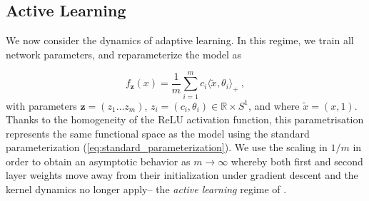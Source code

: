 \subsection{Active Learning}

We now consider the dynamics of adaptive learning. In this regime, we train all network parameters, and reparameterize the model as 


\begin{equation}
    f_\mathbf{z}(x) = \frac{1}{m}\sum_{i=1}^m c_i \langle \tilde{x}, \theta_i \rangle_+~,
\end{equation}
with parameters $\mathbf{z}=(z_1\dots z_m)$, $z_i=(c_i ,\theta_i) \in \mathbb{R} \times S^1$, and  
where $\tilde{x} = (x, 1)$. %
Thanks to the homogeneity of the ReLU activation function, this parametrisation represents the same functional space as the model using the standard parameterization (\ref{eq:standard_parameterization}).
We use the scaling in $1/m$ in order to obtain an asymptotic behavior as $m\to \infty$ whereby both first and second layer weights 
move away from their initialization under gradient descent and the kernel dynamics no longer apply-- the \emph{active learning} regime of \cite{chizat2018note}. 

